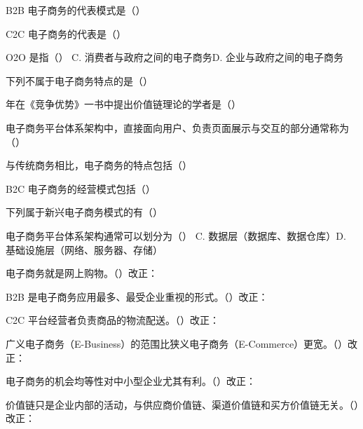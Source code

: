 \documentclass[a4paper,11pt]{article}
\begin{document}
\q B2B 电子商务的代表模式是（\quad）

\q C2C 电子商务的代表是（\quad）

\q O2O 是指（\quad）
{C. 消费者与政府之间的电子商务}{D. 企业与政府之间的电子商务}

\q 下列不属于电子商务特点的是（\quad）

 年在《竞争优势》一书中提出价值链理论的学者是（\quad）

\q 电子商务平台体系架构中，直接面向用户、负责页面展示与交互的部分通常称为（\quad）

\q 与传统商务相比，电子商务的特点包括（\quad）

\q B2C 电子商务的经营模式包括（\quad）

\q 下列属于新兴电子商务模式的有（\quad）

\q 电子商务平台体系架构通常可以划分为（\quad）
{C. 数据层（数据库、数据仓库）}{D. 基础设施层（网络、服务器、存储）}

\q 电子商务就是网上购物。\quad（\quad）\quad 改正：\fixblank

\q B2B 是电子商务应用最多、最受企业重视的形式。\quad（\quad）\quad 改正：\fixblank

\q C2C 平台经营者负责商品的物流配送。\quad（\quad）\quad 改正：\fixblank

\q 广义电子商务（E-Business）的范围比狭义电子商务（E-Commerce）更宽。\quad（\quad）\quad 改正：\fixblank

\q 电子商务的机会均等性对中小型企业尤其有利。\quad（\quad）\quad 改正：\fixblank

\q 价值链只是企业内部的活动，与供应商价值链、渠道价值链和买方价值链无关。\quad（\quad）\quad 改正：\fixblank
\end{document}
